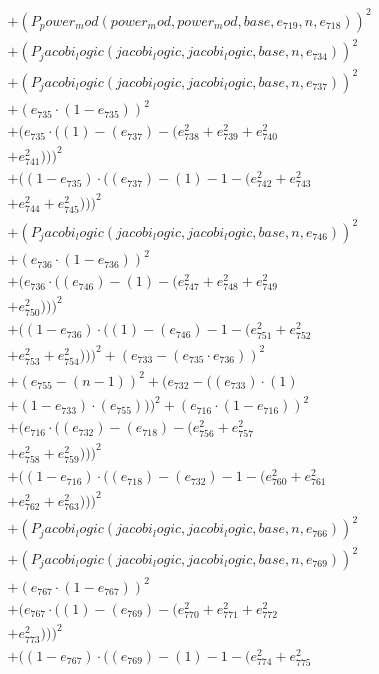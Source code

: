 \documentclass[10pt, a4paper]{article}
\begin{document}
\begin{small}
\begin{align*}
& + (P_power_mod(power_mod, power_mod, base, e_{719}, n, e_{718}))^{2} \\
& + (P_jacobi_logic(jacobi_logic, jacobi_logic, base, n, e_{734}))^{2} \\
& + (P_jacobi_logic(jacobi_logic, jacobi_logic, base, n, e_{737}))^{2} \\
& + (e_{735}  \cdot  (1 - e_{735}))^{2} \\
& + (e_{735}  \cdot  ((1) - (e_{737}) - (e_{738}^{2} + e_{739}^{2} + e_{740}^{2} \\
& + e_{741}^{2})))^{2} \\
& + ((1 - e_{735})  \cdot  ((e_{737}) - (1) - 1 - (e_{742}^{2} + e_{743}^{2} \\
& + e_{744}^{2} + e_{745}^{2})))^{2} \\
& + (P_jacobi_logic(jacobi_logic, jacobi_logic, base, n, e_{746}))^{2} \\
& + (e_{736}  \cdot  (1 - e_{736}))^{2} \\
& + (e_{736}  \cdot  ((e_{746}) - (1) - (e_{747}^{2} + e_{748}^{2} + e_{749}^{2} \\
& + e_{750}^{2})))^{2} \\
& + ((1 - e_{736})  \cdot  ((1) - (e_{746}) - 1 - (e_{751}^{2} + e_{752}^{2} \\
& + e_{753}^{2} + e_{754}^{2})))^{2} + (e_{733} - (e_{735}  \cdot  e_{736}))^{2} \\
& + (e_{755} - (n - 1))^{2} + (e_{732} - ((e_{733})  \cdot  (1) \\
& + (1 - e_{733})  \cdot  (e_{755})))^{2} + (e_{716}  \cdot  (1 - e_{716}))^{2} \\
& + (e_{716}  \cdot  ((e_{732}) - (e_{718}) - (e_{756}^{2} + e_{757}^{2} \\
& + e_{758}^{2} + e_{759}^{2})))^{2} \\
& + ((1 - e_{716})  \cdot  ((e_{718}) - (e_{732}) - 1 - (e_{760}^{2} + e_{761}^{2} \\
& + e_{762}^{2} + e_{763}^{2})))^{2} \\
& + (P_jacobi_logic(jacobi_logic, jacobi_logic, base, n, e_{766}))^{2} \\
& + (P_jacobi_logic(jacobi_logic, jacobi_logic, base, n, e_{769}))^{2} \\
& + (e_{767}  \cdot  (1 - e_{767}))^{2} \\
& + (e_{767}  \cdot  ((1) - (e_{769}) - (e_{770}^{2} + e_{771}^{2} + e_{772}^{2} \\
& + e_{773}^{2})))^{2} \\
& + ((1 - e_{767})  \cdot  ((e_{769}) - (1) - 1 - (e_{774}^{2} + e_{775}^{2} \\

\end{align*}
\end{small}
\end{document}
